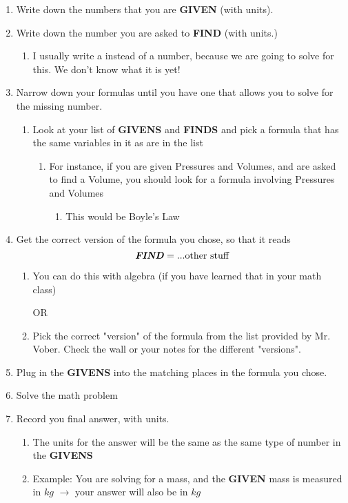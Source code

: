 \documentclass[../../main.tex]{subfiles}
\begin{document}
 \begin{enumerate}
	\item Write down the numbers that you are \textbf{GIVEN} (with units).
	\item Write down the number you are asked to \textbf{FIND} (with units.)
	      \begin{enumerate}
		      \item I usually write a \textbf{} instead of a number, because we are going to solve for this.  We don't know what it is yet!
	      \end{enumerate}
	\item Narrow down your formulas until you have one that allows you to solve for the missing number.
	      \begin{enumerate}
		      \item Look at your list of \textbf{GIVENS} and \textbf{FINDS} and pick a formula that has the same variables in it as are in the list
		            \begin{enumerate}
			            \item For instance, if you are given Pressures and Volumes, and are asked to find a Volume, you should look for a formula involving Pressures and Volumes
			                  \begin{enumerate}
				                  \item This would be Boyle's Law
			                  \end{enumerate}
		            \end{enumerate}
	      \end{enumerate}
	\item Get the correct version of the formula you chose, so that it reads \[\textbf{\emph{FIND}} = ...\text{other stuff}\]
	      \begin{enumerate}
		      \item You can do this with algebra (if you have learned that in your math class)

		            OR

		      \item Pick the correct "version" of the formula from the list provided by Mr. Vober.  Check the wall or your notes for the different "versions".
	      \end{enumerate}
	\item Plug in the \textbf{GIVENS} into the matching places in the formula you chose.
	\item Solve the math problem
	\item Record you final answer, with units.
	\begin{enumerate}
		\item The units for the answer will be the same as the same type of number in the \textbf{GIVENS}
		\item Example: You are solving for a mass, and the \textbf{GIVEN} mass is measured in $kg$ $\rightarrow$ your answer will also be in $kg$
	\end{enumerate}
\end{enumerate}
\end{document}
